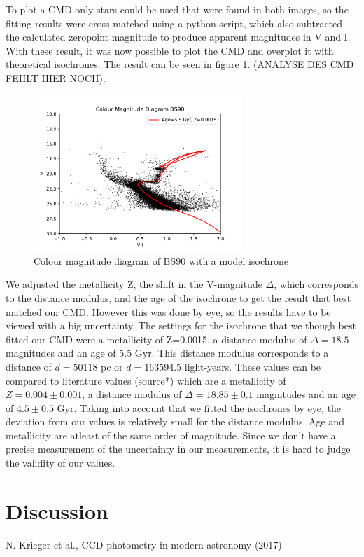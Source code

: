 \documentclass[12pt]{article}
\begin{document}
To plot a CMD only stars could be used that were found in both images, so the fitting results were cross-matched using a python script, which also subtracted the calculated zeropoint magnitude to produce apparent magnitudes in V and I.  With these result, it was now possible to plot the CMD and overplot it with theoretical isochrones. The result can be seen in figure \ref{CMD}. (ANALYSE DES CMD FEHLT HIER NOCH).
\begin{figure}[H]
	\centering
	\includegraphics[width=0.7\textwidth]{figures/CMD.pdf}
	\caption{Colour magnitude diagram of BS90 with a model isochrone}
	\label{CMD}
\end{figure}
We adjusted the metallicity Z, the shift in the V-magnitude $\Delta$, which corresponds to the distance modulus, and the age of the isochrone to get the result that best matched our CMD. However this was done by eye, so the results have to be viewed with a big uncertainty. The settings for the isochrone that we though best fitted our CMD were a metallicity of Z=0.0015, a distance modulus of $\Delta=18.5$ magnitudes and an age of 5.5 Gyr. This distance modulus corresponds to a distance of $d=50118$ pc or $d=163594.5$ light-years. These values can be compared to literature values (source*) which are a metallicity of $Z=0.004\pm0.001$, a distance modulus of $\Delta=18.85\pm0.1$ magnitudes and an age of $4.5\pm0.5$ Gyr. Taking into account that we fitted the isochrones by eye, the deviation from our values is relatively small for the distance modulus. Age and metallicity are atleast of the same order of magnitude. Since we don't have a precise measurement of the uncertainty in our measurements, it is hard to judge the validity of our values. 

\section{Discussion}

\newpage
\begin{thebibliography}{00}   %

 N. Krieger et al., CCD photometry in modern astronomy (2017)

\end{thebibliography}
\end{document}
